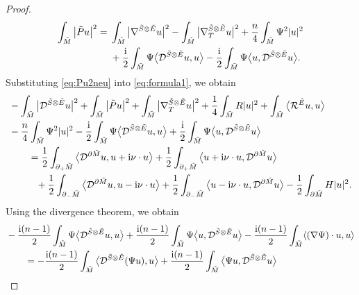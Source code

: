 \begin{proof}
\begin{align}
\int_{\tilde{M}} \big|\tilde{P} u\big|^2
={}& \int_{\tilde{M}} \big|\nabla^{\tilde{S} \otimes \tilde{E}} u\big|^2 - \int_{\tilde{M}} \big|\nabla_T^{\tilde{S} \otimes \tilde{E}} u\big|^2 + \frac{n}{4} \int_{\tilde{M}} \Psi^2 |u|^2\nonumber \\
& + \frac{\rm i}{2} \int_{\tilde{M}} \Psi \big\langle \mathcal{D}^{\tilde{S} \otimes \tilde{E}} u,u \big\rangle - \frac{\rm i}{2} \int_{\tilde{M}} \Psi \big\langle u,\mathcal{D}^{\tilde{S} \otimes \tilde{E}} u \big\rangle.\label{eq:Pu2neu}
\end{align}
Substituting \eqref{eq:Pu2neu} into \eqref{eq:formula1}, we obtain
\begin{align}
&- \int_{\tilde{M}} \big|\mathcal{D}^{\tilde{S} \otimes \tilde{E}} u\big|^2 + \int_{\tilde{M}} \big|\tilde{P} u\big|^2 + \int_{\tilde{M}} \big|\nabla_T^{\tilde{S} \otimes \tilde{E}} u\big|^2 + \frac{1}{4} \int_{\tilde{M}} R |u|^2
+ \int_{\tilde{M}} \big\langle \mathcal{R}^{\tilde{E}} u,u \big\rangle \nonumber\\
&- \frac{n}{4} \int_{\tilde{M}} \Psi^2 |u|^2
 - \frac{\rm i}{2} \int_{\tilde{M}} \Psi \big\langle \mathcal{D}^{\tilde{S} \otimes \tilde{E}} u,u \big\rangle + \frac{\rm i}{2} \int_{\tilde{M}} \Psi \big\langle u,\mathcal{D}^{\tilde{S} \otimes \tilde{E}} u \big\rangle\nonumber \\
&\qquad= \frac{1}{2} \int_{\partial_+ \tilde{M}} \big\langle \mathcal{D}^{\partial \tilde{M}} u,u + {\rm i} \nu \cdot u \big\rangle + \frac{1}{2} \int_{\partial_+ \tilde{M}} \big\langle u + {\rm i} \nu \cdot u,\mathcal{D}^{\partial \tilde{M}} u \big\rangle\nonumber \\
&\qquad\phantom{=}{} + \frac{1}{2} \int_{\partial_- \tilde{M}} \big\langle \mathcal{D}^{\partial \tilde{M}} u,u - {\rm i} \nu \cdot u \big\rangle + \frac{1}{2} \int_{\partial_- \tilde{M}} \big\langle u - {\rm i} \nu \cdot u,\mathcal{D}^{\partial \tilde{M}} u \big\rangle - \frac{1}{2} \int_{\partial \tilde{M}} H |u|^2.\label{eq:formula2}
\end{align}
Using the divergence theorem, we obtain
\begin{align}
&- \frac{{\rm i}(n-1)}{2} \int_{\tilde{M}} \Psi \big\langle \mathcal{D}^{\tilde{S} \otimes \tilde{E}} u,u \big\rangle + \frac{{\rm i}(n-1)}{2} \int_{\tilde{M}} \Psi \big\langle u,\mathcal{D}^{\tilde{S} \otimes \tilde{E}} u \big\rangle
- \frac{{\rm i}(n-1)}{2} \int_{\tilde{M}} \langle (\nabla \Psi) \cdot u,u \rangle\nonumber \\
&\qquad= - \frac{{\rm i}(n-1)}{2} \int_{\tilde{M}} \big\langle \mathcal{D}^{\tilde{S} \otimes \tilde{E}} (\Psi u),u \big\rangle + \frac{{\rm i}(n-1)}{2} \int_{\tilde{M}} \big\langle \Psi u,\mathcal{D}^{\tilde{S} \otimes \tilde{E}} u \big\rangle\nonumber \\

\end{align}
\end{proof}

